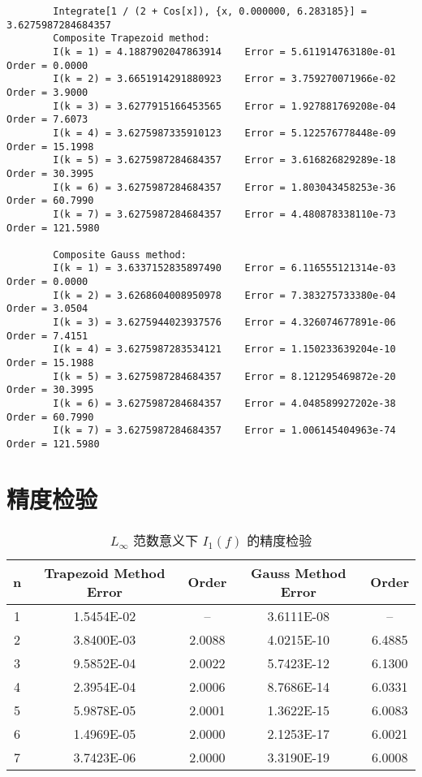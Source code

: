 \documentclass{ctexart}
\begin{document}
\begin{verbatim}
		Integrate[1 / (2 + Cos[x]), {x, 0.000000, 6.283185}] = 3.6275987284684357
		Composite Trapezoid method:
		I(k = 1) = 4.1887902047863914 	 Error = 5.611914763180e-01 	 Order = 0.0000
		I(k = 2) = 3.6651914291880923 	 Error = 3.759270071966e-02 	 Order = 3.9000
		I(k = 3) = 3.6277915166453565 	 Error = 1.927881769208e-04 	 Order = 7.6073
		I(k = 4) = 3.6275987335910123 	 Error = 5.122576778448e-09 	 Order = 15.1998
		I(k = 5) = 3.6275987284684357 	 Error = 3.616826829289e-18 	 Order = 30.3995
		I(k = 6) = 3.6275987284684357 	 Error = 1.803043458253e-36 	 Order = 60.7990
		I(k = 7) = 3.6275987284684357 	 Error = 4.480878338110e-73 	 Order = 121.5980
		
		Composite Gauss method:
		I(k = 1) = 3.6337152835897490 	 Error = 6.116555121314e-03 	 Order = 0.0000
		I(k = 2) = 3.6268604008950978 	 Error = 7.383275733380e-04 	 Order = 3.0504
		I(k = 3) = 3.6275944023937576 	 Error = 4.326074677891e-06 	 Order = 7.4151
		I(k = 4) = 3.6275987283534121 	 Error = 1.150233639204e-10 	 Order = 15.1988
		I(k = 5) = 3.6275987284684357 	 Error = 8.121295469872e-20 	 Order = 30.3995
		I(k = 6) = 3.6275987284684357 	 Error = 4.048589927202e-38 	 Order = 60.7990
		I(k = 7) = 3.6275987284684357 	 Error = 1.006145404963e-74 	 Order = 121.5980
	\end{verbatim}
	
\section*{精度检验}
	\begin{table}[H]
		\centering
		\bigskip
		\begin{small}
			\begin{tabular}{|c|cc|cc|}
				\hline
				n & Trapezoid Method Error & Order & Gauss Method Error & Order\\
				\hline
				1 & 1.5454E-02 & -- & 3.6111E-08 & --\\
				2 & 3.8400E-03 & 2.0088 & 4.0215E-10 & 6.4885\\
				3 & 9.5852E-04 & 2.0022 & 5.7423E-12 & 6.1300\\
				4 & 2.3954E-04 & 2.0006 & 8.7686E-14 & 6.0331\\
				5 & 5.9878E-05 & 2.0001 & 1.3622E-15 & 6.0083\\
				6 & 1.4969E-05 & 2.0000 & 2.1253E-17 & 6.0021\\
				7 & 3.7423E-06 & 2.0000 & 3.3190E-19 & 6.0008\\
				\hline
			\end{tabular}
		\end{small}
		\caption{\label{table1.label} $L_\infty$ 范数意义下 $I_1(f)$ 的精度检验} 
	\end{table}
	
\end{document}

